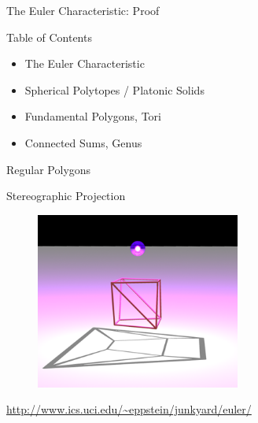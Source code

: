 \documentclass{beamer}
\begin{document}
\begin{frame}{The Euler Characteristic: Proof}



\end{frame}


\begin{frame}{Table of Contents}
\begin{itemize}[label=$\vartriangleright$]
	\item The Euler Characteristic
\end{itemize}
\begin{itemize}[label=$\blacktriangleright$]
	\item Spherical Polytopes / Platonic Solids
\end{itemize}
\begin{itemize}[label=$\vartriangleright$]
	\item Fundamental Polygons, Tori
\end{itemize}
\begin{itemize}[label=$\vartriangleright$]
	\item Connected Sums, Genus
\end{itemize}
\end{frame}

\begin{frame}{Regular Polygons}

\end{frame}

\begin{frame}{Stereographic Projection}

\begin{figure}[t]
    \includegraphics[width=0.6\textwidth]{shadow.png}
\end{figure}

\small \url{http://www.ics.uci.edu/~eppstein/junkyard/euler/}

\end{frame}
\end{document}
